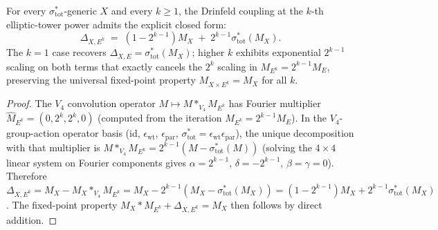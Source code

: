 \begin{corollary}
\label{cor:universal-drinfeld-coupling-E-k}
For every $\sigma_{\mathrm{tot}}^*$-generic $X$ and every $k \geq 1$, the
Drinfeld coupling at the $k$-th elliptic-tower power admits the explicit
closed form:
\[
 \boxed{\;\Delta_{X, E^k} \;=\; (1 - 2^{k-1}) M_X \;+\; 2^{k-1} \sigma_{\mathrm{tot}}^*(M_X).\;}
\]
The $k = 1$ case recovers $\Delta_{X, E} = \sigma_{\mathrm{tot}}^*(M_X)$;
higher $k$ exhibits exponential $2^{k-1}$ scaling on both terms that exactly
cancels the $2^k$ scaling in $M_{E^k} = 2^{k-1} M_E$, preserving the
universal fixed-point property $M_{X \times E^k} = M_X$ for all $k$.
\end{corollary}

\begin{proof}
The $V_4$ convolution operator $M \mapsto M *_{V_4} M_{E^k}$ has Fourier
multiplier $\hat M_{E^k} = (0, 2^k, 2^k, 0)$ \textup{(}computed from the
iteration $M_{E^k} = 2^{k-1} M_E$\textup{).} In the $V_4$-group-action
operator basis (id, $\epsilon_{\mathrm{wt}}$, $\epsilon_{\mathrm{par}}$,
$\sigma_{\mathrm{tot}}^* = \epsilon_{\mathrm{wt}} \epsilon_{\mathrm{par}}$),
the unique decomposition with that multiplier is
$M *_{V_4} M_{E^k} = 2^{k-1}(M - \sigma_{\mathrm{tot}}^*(M))$
\textup{(}solving the $4 \times 4$ linear system on Fourier components gives
$\alpha = 2^{k-1}$, $\delta = -2^{k-1}$, $\beta = \gamma = 0$\textup{).}
Therefore
$\Delta_{X, E^k} = M_X - M_X *_{V_4} M_{E^k}
 = M_X - 2^{k-1}(M_X - \sigma_{\mathrm{tot}}^*(M_X))
 = (1 - 2^{k-1}) M_X + 2^{k-1} \sigma_{\mathrm{tot}}^*(M_X)$.
The fixed-point property $M_X * M_{E^k} + \Delta_{X, E^k} = M_X$ then
follows by direct addition.
\end{proof}


